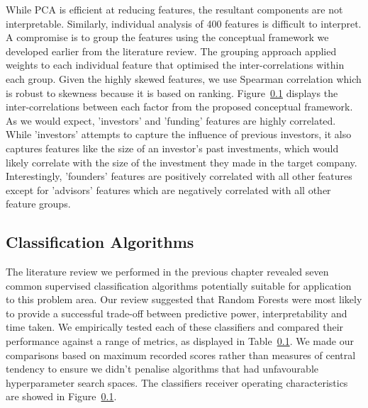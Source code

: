 \documentclass[../thesis/thesis.tex]{subfiles}
\begin{document}


While PCA is efficient at reducing features, the resultant components are not interpretable. Similarly, individual analysis of 400\+ features is difficult to interpret. A compromise is to group the features using the conceptual framework we developed earlier from the literature review. The grouping approach applied weights to each individual feature that optimised the inter-correlations within each group. Given the highly skewed features, we use Spearman correlation which is robust to skewness because it is based on ranking. Figure~\ref{} displays the inter-correlations between each factor from the proposed conceptual framework. As we would expect, 'investors' and 'funding' features are highly correlated. While 'investors' attempts to capture the influence of previous investors, it also captures features like the size of an investor's past investments, which would likely correlate with the size of the investment they made in the target company. Interestingly, 'founders' features are positively correlated with all other features except for 'advisors' features which are negatively correlated with all other feature groups.


\subsection{Classification Algorithms}

The literature review we performed in the previous chapter revealed seven common supervised classification algorithms potentially suitable for application to this problem area. Our review suggested that Random Forests were most likely to provide a successful trade-off between predictive power, interpretability and time taken. We empirically tested each of these classifiers and compared their performance against a range of metrics, as displayed in Table~\ref{}. We made our comparisons based on maximum recorded scores rather than measures of central tendency to ensure we didn't penalise algorithms that had unfavourable hyperparameter search spaces. The classifiers receiver operating characteristics are showed in Figure~\ref{}.



\end{document}
